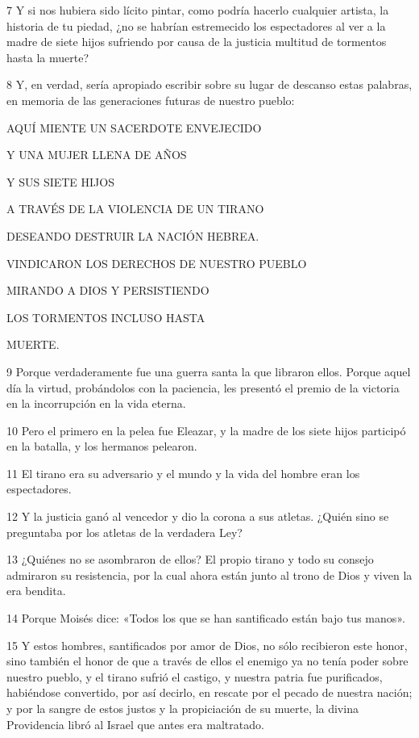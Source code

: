 \par 7 Y si nos hubiera sido lícito pintar, como podría hacerlo cualquier artista, la historia de tu piedad, ¿no se habrían estremecido los espectadores al ver a la madre de siete hijos sufriendo por causa de la justicia multitud de tormentos hasta la muerte?

\par 8 Y, en verdad, sería apropiado escribir sobre su lugar de descanso estas palabras, en memoria de las generaciones futuras de nuestro pueblo:

\par AQUÍ MIENTE UN SACERDOTE ENVEJECIDO
\par Y UNA MUJER LLENA DE AÑOS
\par Y SUS SIETE HIJOS
\par A TRAVÉS DE LA VIOLENCIA DE UN TIRANO
\par DESEANDO DESTRUIR LA NACIÓN HEBREA.
\par VINDICARON LOS DERECHOS DE NUESTRO PUEBLO
\par MIRANDO A DIOS Y PERSISTIENDO
\par LOS TORMENTOS INCLUSO HASTA
\par MUERTE.

\par 9 Porque verdaderamente fue una guerra santa la que libraron ellos. Porque aquel día la virtud, probándolos con la paciencia, les presentó el premio de la victoria en la incorrupción en la vida eterna.

\par 10 Pero el primero en la pelea fue Eleazar, y la madre de los siete hijos participó en la batalla, y los hermanos pelearon.

\par 11 El tirano era su adversario y el mundo y la vida del hombre eran los espectadores.

\par 12 Y la justicia ganó al vencedor y dio la corona a sus atletas. ¿Quién sino se preguntaba por los atletas de la verdadera Ley?

\par 13 ¿Quiénes no se asombraron de ellos? El propio tirano y todo su consejo admiraron su resistencia, por la cual ahora están junto al trono de Dios y viven la era bendita.

\par 14 Porque Moisés dice: «Todos los que se han santificado están bajo tus manos».

\par 15 Y estos hombres, santificados por amor de Dios, no sólo recibieron este honor, sino también el honor de que a través de ellos el enemigo ya no tenía poder sobre nuestro pueblo, y el tirano sufrió el castigo, y nuestra patria fue purificados, habiéndose convertido, por así decirlo, en rescate por el pecado de nuestra nación; y por la sangre de estos justos y la propiciación de su muerte, la divina Providencia libró al Israel que antes era maltratado.

